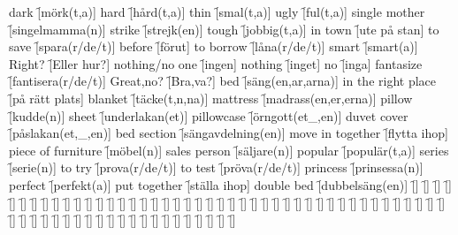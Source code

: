 \begin{questions}
\begin{multicols}{2}
        \question dark \f[mörk(t,a)]
        \question hard \f[hård(t,a)]
        \question thin \f[smal(t,a)]
        \question ugly \f[ful(t,a)]
        \question single mother \f[singelmamma(n)]
        \question strike \f[strejk(en)]
        \question tough \f[jobbig(t,a)]
        \question in town \f[ute på stan]
        \question to save \f[spara(r/de/t)]
        \question before \f[förut]
        \question to borrow \f[låna(r/de/t)]
        \question smart \f[smart(a)]
        \question Right? \f[Eller hur?]
        \question nothing/no one \f[ingen]
        \question nothing \f[inget]
        \question no \f[inga]
        \question fantasize \f[fantisera(r/de/t)]
        \question Great,no? \f[Bra,va?]
        \question bed \f[säng(en,ar,arna)]
        \question in the right place \f[på rätt plats]
        \question blanket \f[täcke(t,n,na)]
        \question mattress \f[madrass(en,er,erna)]
        \question pillow \f[kudde(n)]
        \question sheet \f[underlakan(et)]
        \question pillowcase \f[örngott(et\_,en)]
        \question duvet cover \f[påslakan(et,\_,en)]
        \question bed section \f[sängavdelning(en)]
        \question move in together \f[flytta ihop]
        \question piece of furniture \f[möbel(n)]
        \question sales person \f[säljare(n)]
        \question popular \f[populär(t,a)]
        \question series \f[serie(n)]
        \question to try \f[prova(r/de/t)]
        \question to test \f[pröva(r/de/t)]
        \question princess \f[prinsessa(n)]
        \question perfect \f[perfekt(a)]
        \question put together \f[ställa ihop]
        \question double bed \f[dubbelsäng(en)]
        \question  \f[]
        \question  \f[]
        \question  \f[]
        \question  \f[]
        \question  \f[]
        \question  \f[]
        \question  \f[]
        \question  \f[]
        \question  \f[]
        \question  \f[]
        \question  \f[]
        \question  \f[]
        \question  \f[]
        \question  \f[]
        \question  \f[]
        \question  \f[]
        \question  \f[]
        \question  \f[]
        \question  \f[]
        \question  \f[]
        \question  \f[]
        \question  \f[]
        \question  \f[]
        \question  \f[]
        \question  \f[]
        \question  \f[]
        \question  \f[]
        \question  \f[]
        \question  \f[]
        \question  \f[]
        \question  \f[]
        \question  \f[]
        \question  \f[]
        \question  \f[]
        \question  \f[]
        \question  \f[]
        \question  \f[]
        \question  \f[]
        \question  \f[]
        \question  \f[]
        \question  \f[]
        \question  \f[]
        \question  \f[]
        \question  \f[]
        \question  \f[]
        \question  \f[]
        \question  \f[]
        \question  \f[]
        \question  \f[]
        \question  \f[]
        \question  \f[]
        \question  \f[]
        \question  \f[]
        \question  \f[]
        \question  \f[]
        \question  \f[]
        \question  \f[]
        \question  \f[]
        \question  \f[]
        \question  \f[]
        \question  \f[]
        \question  \f[]
        \question  \f[]
        \question  \f[]
        \question  \f[]
    \end{multicols}
\end{questions}
